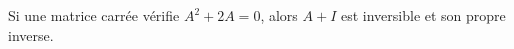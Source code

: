Si une matrice carrée vérifie $A^2+2A=0$, alors $A+I$ est inversible et son propre inverse.

\begin{reponses}
\end{reponses}

\begin{comment}
Il suffit de vérifier la définition d'inverse.
\end{comment}

